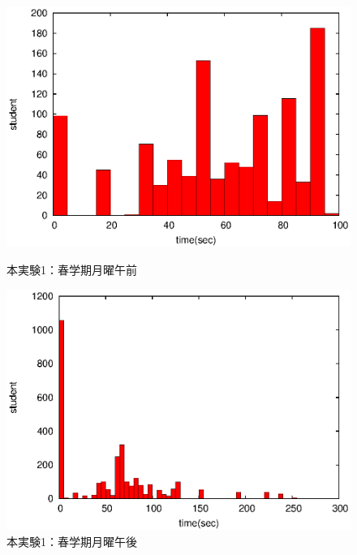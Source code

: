 \documentclass[a4paper,10pt]{jarticle}
\begin{document}
\fi

\begin{figure}[htpb]                        
\begin{minipage} {0.5\hsize}                             
\begin{center}                              
\includegraphics[bb=0 0 390 248,clip,width=\hsize]{oMo12_hist.eps}   
\caption{本実験1：春学期月曜午前}                              
\label{oMo12}                                
\end{center}                                    
\end{minipage}                                 
\begin{minipage}{0.5\hsize}                                            
\begin{center}                              
\includegraphics[bb=0 0 390 248,clip,width=\hsize]{oMo345_hist.eps}   
\caption{本実験1：春学期月曜午後}                              
\label{oMo345}                                
\end{center}                                    
\end{minipage}                                 
\end{figure}                                 
\end{document}
